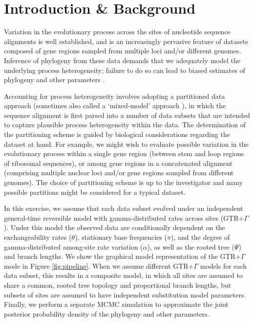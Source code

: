 \section{Introduction \& Background}

Variation in the evolutionary process across the sites of nucleotide sequence alignments is well established, and is an increasingly pervasive feature of datasets composed of gene regions sampled from multiple loci and/or different genomes.
Inference of phylogeny from these data demands that we adequately model the underlying process heterogeneity; failure to do so can lead to biased estimates of phylogeny and other parameters \citep{Brown2007}.

Accounting for process heterogeneity involves adopting a partitioned data approach (sometimes also called a `mixed-model' approach \citep{Ronquist2003}), in which the sequence alignment is first parsed into a number of data subsets that are intended to capture plausible process heterogeneity within the data.
The determination of the partitioning scheme is guided by biological considerations regarding the dataset at hand.
For example, we might wish to evaluate possible variation in the evolutionary process within a single gene region (\EG between stem and loop regions of ribosomal sequences), or among gene regions in a concatenated alignment (\EG comprising multiple nuclear loci and/or gene regions sampled from different genomes).
The choice of partitioning scheme is up to the investigator and many possible partitions might be considered for a typical dataset.

In this exercise, we assume that each data subset evolved under an independent general-time reversible model with gamma-distributed rates across sites (GTR+$\Gamma$). 
Under this model the observed data are conditionally dependent on the exchangeability rates ($\theta$), stationary base frequencies ($\pi$), and the degree of gamma-distributed among-site rate variation ($\alpha$), as well as the rooted tree ($\Psi$) and branch lengths.
We show the graphical model representation of the GTR+$\Gamma$ mode in Figure \ref{fig:pipeline}. 
When we assume different GTR+$\Gamma$ models for each data subset, this results in a composite model, in which all sites are assumed to share a common, rooted tree topology and proportional branch lengths, but subsets of sites are assumed to have independent substitution model parameters.
Finally, we perform a separate MCMC simulation to approximate the joint posterior probability density of the phylogeny and other parameters. 

